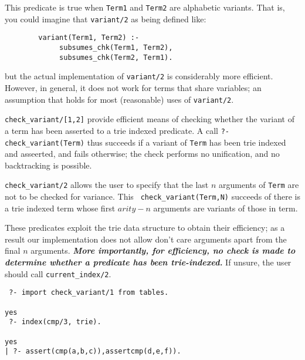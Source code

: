 \begin{description}
    This predicate is true when {\tt Term1} and {\tt Term2} are 
    alphabetic variants.  That is, you could imagine that {\tt variant/2}
    as being defined like:
    \begin{center}
    \begin{minipage}{3.5in}
    \begin{verbatim}
        variant(Term1, Term2) :-
             subsumes_chk(Term1, Term2),
             subsumes_chk(Term2, Term1).
    \end{verbatim}
    \end{minipage}
    \end{center}
    but the actual implementation of {\tt variant/2} is considerably more
    efficient.  However, in general, it does not work for terms that share
    variables; an assumption that holds for most (reasonable) uses of
    {\tt variant/2}.

%
 {\tt check\_variant/[1,2]} provide efficient means of checking
 whether the variant of a term has been asserted to a trie indexed
 predicate.  A call {\tt ?- check\_variant(Term)} thus succeeds if a
 variant of {\tt Term} has been trie indexed and asseerted, and fails
 otherwise; the check performs no unification, and no backtracking is
 possible.

{\tt check\_variant/2} allows the user to specify that the last $n$
arguments of {\tt Term} are not to be checked for variance.  This {\tt
  check\_variant(Term,N)} succeeds of there is a trie indexed term
whose first $arity - n$ arguments are variants of those in term.

These predicates exploit the trie data structure to obtain their
efficiency; as a result our implementation does not allow don't care
arguments apart from the final $n$ arguments.  {\bf {\em More
    importantly, for efficiency, no check is made to determine whether
    a predicate has been trie-indexed.}}  If unsure, the user should
call {\tt current\_index/2}.
%
\begin{example}
\begin{small}
\begin{verbatim}
 ?- import check_variant/1 from tables.

yes
 ?- index(cmp/3, trie).

yes
| ?- assert(cmp(a,b,c)),assertcmp(d,e,f)).


\end{verbatim}
\end{small}
\end{example}
\end{description}
